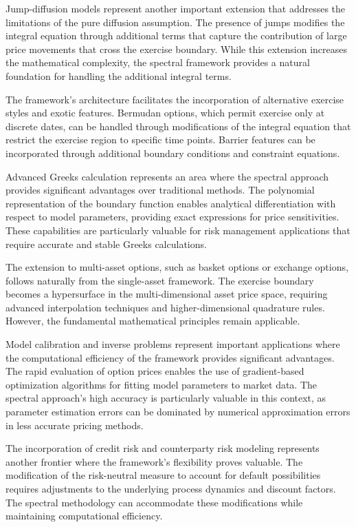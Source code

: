 \documentclass[
  american,
  11pt,
  11pt,
  letterpaper,
  onecolumn]{article}
\begin{document}
Jump-diffusion models represent another important extension that
addresses the limitations of the pure diffusion assumption. The presence
of jumps modifies the integral equation through additional terms that
capture the contribution of large price movements that cross the
exercise boundary. While this extension increases the mathematical
complexity, the spectral framework provides a natural foundation for
handling the additional integral terms.

The framework's architecture facilitates the incorporation of
alternative exercise styles and exotic features. Bermudan options, which
permit exercise only at discrete dates, can be handled through
modifications of the integral equation that restrict the exercise region
to specific time points. Barrier features can be incorporated through
additional boundary conditions and constraint equations.

Advanced Greeks calculation represents an area where the spectral
approach provides significant advantages over traditional methods. The
polynomial representation of the boundary function enables analytical
differentiation with respect to model parameters, providing exact
expressions for price sensitivities. These capabilities are particularly
valuable for risk management applications that require accurate and
stable Greeks calculations.

The extension to multi-asset options, such as basket options or exchange
options, follows naturally from the single-asset framework. The exercise
boundary becomes a hypersurface in the multi-dimensional asset price
space, requiring advanced interpolation techniques and
higher-dimensional quadrature rules. However, the fundamental
mathematical principles remain applicable.

Model calibration and inverse problems represent important applications
where the computational efficiency of the framework provides significant
advantages. The rapid evaluation of option prices enables the use of
gradient-based optimization algorithms for fitting model parameters to
market data. The spectral approach's high accuracy is particularly
valuable in this context, as parameter estimation errors can be
dominated by numerical approximation errors in less accurate pricing
methods.

The incorporation of credit risk and counterparty risk modeling
represents another frontier where the framework's flexibility proves
valuable. The modification of the risk-neutral measure to account for
default possibilities requires adjustments to the underlying process
dynamics and discount factors. The spectral methodology can accommodate
these modifications while maintaining computational efficiency.
\end{document}
